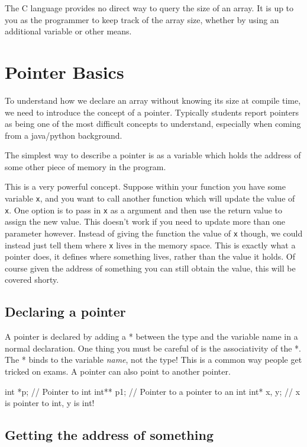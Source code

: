 The C language provides no direct way to query the size of an array.
It is up to you as the programmer to keep track of the array size, whether by using an additional variable or other means.

\section{Pointer Basics}

To understand how we declare an array without knowing its size at compile time, we need to introduce the concept of a pointer.
Typically students report pointers as being one of the most difficult concepts to understand, especially when coming from a java/python background.

The simplest way to describe a pointer is as a variable which holds the address of some other piece of memory in the program.

This is a very powerful concept.
Suppose within your function you have some variable \texttt{x}, and you want to call another function which will update the value of \texttt{x}.
One option is to pass in \texttt{x} as a argument and then use the return value to assign the new value.
This doesn't work if you need to update more than one parameter however.
Instead of giving the function the value of \texttt{x} though, we could instead just tell them where \texttt{x} lives in the memory space.
This is exactly what a pointer does, it defines where something lives, rather than the value it holds. 
Of course given the address of something you can still obtain the value, this will be covered shorty.

\subsection{Declaring a pointer}

A pointer is declared by adding a * between the type and the variable name in a normal declaration.
One thing you must be careful of is the associativity of the *.
The * binds to the variable \emph{name}, not the type!
This is a common way people get tricked on exams.
A pointer can also point to another pointer.

\begin{codeblock}
int *p; // Pointer to int
int** p1; // Pointer to a pointer to an int
int* x, y; // x is pointer to int, y is int!
\end{codeblock}

\subsection{Getting the address of something}

